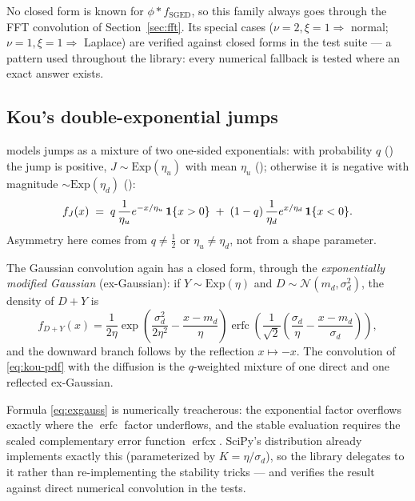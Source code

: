 No closed form is known for $\phi * f_{\mathrm{SGED}}$, so this family
always goes through the FFT convolution of Section~\ref{sec:fft}. Its
special cases ($\nu{=}2, \xi{=}1 \Rightarrow$ normal; $\nu{=}1, \xi{=}1
\Rightarrow$ Laplace) are verified against closed forms in the test suite
--- a pattern used throughout the library: every numerical fallback is
tested where an exact answer exists.

\subsection{Kou's double-exponential jumps}
\label{sec:kou}

\citet{Kou2002} models jumps as a mixture of two one-sided exponentials:
with probability $q$ () the jump is positive,
$J \sim \mathrm{Exp}(\eta_u)$ with mean $\eta_u$
(); otherwise it is negative with magnitude
$\sim \mathrm{Exp}(\eta_d)$ ():
\begin{equation}
  f_J(x)
  \;=\;
  q\, \frac{1}{\eta_u} e^{-x/\eta_u}\, \mathbf{1}\{x > 0\}
  \;+\;
  (1 - q)\, \frac{1}{\eta_d} e^{x/\eta_d}\, \mathbf{1}\{x < 0\}.
  \label{eq:kou-pdf}
\end{equation}
Asymmetry here comes from $q \ne \tfrac12$ or $\eta_u \ne \eta_d$, not
from a shape parameter.

The Gaussian convolution again has a closed form, through the
\emph{exponentially modified Gaussian} (ex-Gaussian): if
$Y \sim \mathrm{Exp}(\eta)$ and $D \sim \mathcal N(m_d, \sigma_d^2)$,
the density of $D + Y$ is
\begin{equation}
  f_{D+Y}(x)
  =
  \frac{1}{2\eta}
  \exp\!\left( \frac{\sigma_d^2}{2\eta^2} - \frac{x - m_d}{\eta} \right)
  \operatorname{erfc}\!\left(
    \frac{1}{\sqrt2}\left( \frac{\sigma_d}{\eta} - \frac{x - m_d}{\sigma_d} \right)
  \right),
  \label{eq:exgauss}
\end{equation}
and the downward branch follows by the reflection $x \mapsto -x$. The
convolution of \eqref{eq:kou-pdf} with the diffusion is the
$q$-weighted mixture of one direct and one reflected ex-Gaussian.

\begin{decision}
\label{dec:exponnorm}
Formula \eqref{eq:exgauss} is numerically treacherous: the exponential
factor overflows exactly where the $\operatorname{erfc}$ factor
underflows, and the stable evaluation requires the scaled complementary
error function $\operatorname{erfcx}$. SciPy's 
distribution already implements exactly this (parameterized by
$K = \eta / \sigma_d$), so the library delegates to it rather than
re-implementing the stability tricks --- and verifies the result against
direct numerical convolution in the tests.
\end{decision}

